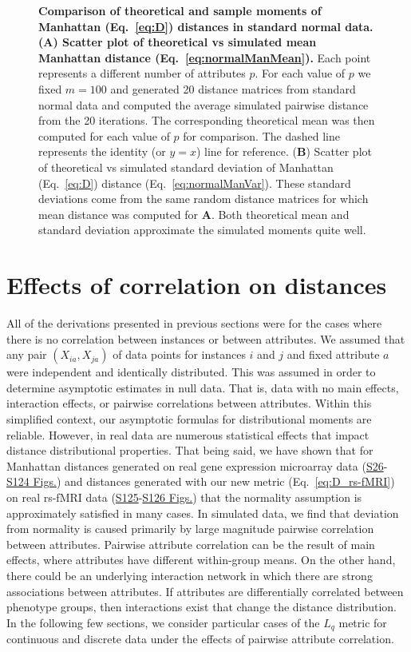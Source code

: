 \documentclass[10pt,letterpaper]{article}
\begin{document}
\begin{figure}[H]
	\centering
	\caption{{\bf Comparison of theoretical and sample moments of Manhattan (Eq.~\ref{eq:D}) distances in standard normal data. (\textbf{A}) Scatter plot of theoretical vs simulated mean Manhattan distance (Eq.~\ref{eq:normalManMean}).} Each point represents a different number of attributes $p$. For each value of $p$ we fixed $m=100$ and generated 20 distance matrices from standard normal data and computed the average simulated pairwise distance from the 20 iterations. The corresponding theoretical mean was then computed for each value of $p$ for comparison. The dashed line represents the identity (or $y=x$) line for reference. (\textbf{B}) Scatter plot of theoretical vs simulated standard deviation of Manhattan (Eq.~\ref{eq:D}) distance (Eq.~\ref{eq:normalManVar}). These standard deviations come from the same random distance matrices for which mean distance was computed for \textbf{A}. Both theoretical mean and standard deviation approximate the simulated moments quite well.}\label{fig:compare_theoretical_sample_moments}
\end{figure}

\section{Effects of correlation on distances}\label{sec:correlation}

All of the derivations presented in previous sections were for the cases where there is no correlation between instances or between attributes. We assumed that any pair $(X_{ia},X_{ja})$ of data points for instances $i$ and $j$ and fixed attribute $a$ were independent and identically distributed. This was assumed in order to determine asymptotic estimates in null data. That is, data with no main effects, interaction effects, or pairwise correlations between attributes. Within this simplified context, our asymptotic formulas for distributional moments are reliable. However, in real data are numerous statistical effects that impact distance distributional properties. That being said, we have shown that for Manhattan distances generated on real gene expression microarray data (\hyperlink{S26_Fig}{S26}-\hyperlink{S124_Fig}{S124 Figs.}) and distances generated with our new metric (Eq.~\ref{eq:D_rs-fMRI}) on real rs-fMRI data (\hyperlink{S125_Fig}{S125}-\hyperlink{S126}{S126 Figs.}) that the normality assumption is approximately satisfied in many cases. In simulated data, we find that deviation from normality is caused primarily by large magnitude pairwise correlation between attributes. Pairwise attribute correlation can be the result of main effects, where attributes have different within-group means. On the other hand, there could be an underlying interaction network in which there are strong associations between attributes. If attributes are differentially correlated between phenotype groups, then interactions exist that change the distance distribution. In the following few sections, we consider particular cases of the $L_q$ metric for continuous and discrete data under the effects of pairwise attribute correlation.
\end{document}
